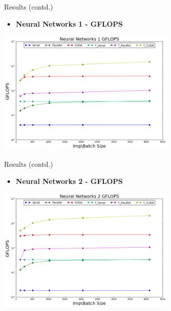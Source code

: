 \begin{frame}{Results (contd.)}
     \begin{itemize}
         \item{ \textbf{Neural Networks 1 - GFLOPS}
         }
     \end{itemize}
     
		\begin{center}
		\includegraphics[width=3.4in]{nn1_gflops.png}
		\end{center}

 \end{frame} 

\begin{frame}{Results (contd.)}
     \begin{itemize}
         \item{ \textbf{Neural Networks 2 - GFLOPS}
         }
     \end{itemize}
     
		\begin{center}
		\includegraphics[width=3.4in]{nn2_gflops.png}
		\end{center}

 \end{frame} 

